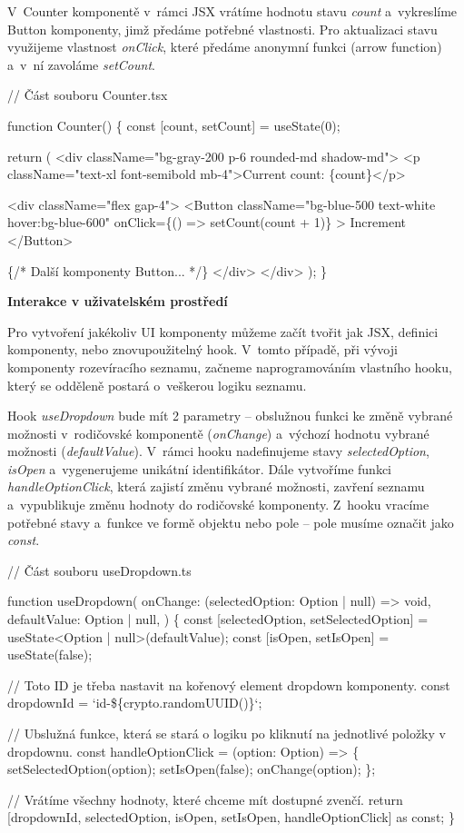V~Counter komponentě v~rámci JSX vrátíme hodnotu stavu \emph{count} a~vykreslíme Button komponenty, jimž předáme potřebné vlastnosti. 
Pro aktualizaci stavu využijeme vlastnost \emph{onClick}, které předáme anonymní funkci (arrow function) a~v~ní zavoláme \emph{setCount}.

\begin{prog}
// Část souboru Counter.tsx

function Counter() \{
  const [count, setCount] = useState(0);

  return (
    <div className="bg-gray-200 p-6 rounded-md shadow-md">
      <p className="text-xl font-semibold mb-4">Current count: \{count\}</p>

      <div className="flex gap-4">
        <Button
          className="bg-blue-500 text-white hover:bg-blue-600"
          onClick=\{() => setCount(count + 1)\}
        >
          Increment
        </Button>

        \{/* Další komponenty Button... */\}
      </div>
    </div>
  );
\}
\end{prog}

\begin{flushleft}
  \textbf{Interakce v uživatelském prostředí}
\end{flushleft}

Pro vytvoření jakékoliv UI komponenty můžeme začít tvořit jak JSX, definici komponenty, nebo znovupoužitelný hook. 
V~tomto případě, při vývoji komponenty rozevíracího seznamu, začneme naprogramováním vlastního hooku, který se odděleně postará o~veškerou logiku seznamu.

Hook \emph{useDropdown} bude mít 2 parametry -- obslužnou funkci ke změně vybrané možnosti v~rodičovské komponentě (\emph{onChange}) a~výchozí hodnotu vybrané možnosti (\emph{defaultValue}). 
V~rámci hooku nadefinujeme stavy \emph{selectedOption}, \emph{isOpen} a~vygenerujeme unikátní identifikátor. 
Dále vytvoříme funkci \emph{handleOptionClick}, která zajistí změnu vybrané možnosti, zavření seznamu a~vypublikuje změnu hodnoty do rodičovské komponenty. 
Z~hooku vracíme potřebné stavy a~funkce ve formě objektu nebo pole -- pole musíme označit jako \emph{const}.

\begin{prog}
// Část souboru useDropdown.ts

function useDropdown(
  onChange: (selectedOption: Option | null) => void,
  defaultValue: Option | null,
) \{
  const [selectedOption, setSelectedOption] 
    = useState<Option | null>(defaultValue);
  const [isOpen, setIsOpen] = useState(false);

  // Toto ID je třeba nastavit na kořenový element dropdown komponenty.
  const dropdownId = `id-\$\{crypto.randomUUID()\}`;

  // Ubslužná funkce, která se stará o logiku
    po kliknutí na jednotlivé položky v dropdownu.
  const handleOptionClick = (option: Option) => \{
    setSelectedOption(option);
    setIsOpen(false);
    onChange(option);
  \};

  // Vrátíme všechny hodnoty, které chceme mít dostupné zvenčí.
  return [dropdownId, selectedOption, 
    isOpen, setIsOpen, handleOptionClick] as const;
\}
\end{prog}

